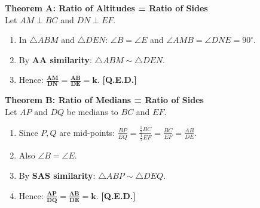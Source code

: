\documentclass[10pt,a4paper]{article}
\begin{document}
\begin{minipage}[t]{0.54\textwidth}
  \textbf{Theorem A: Ratio of Altitudes = Ratio of Sides}\\
  Let $AM \perp BC$ and $DN \perp EF$.
  \begin{enumerate}[leftmargin=4.5mm, itemsep=1.2pt]
    \item In $\triangle ABM$ and $\triangle DEN$:
      $\angle B = \angle E$ and $\angle AMB = \angle DNE = 90^\circ$.
    \item By \textbf{AA similarity}: $\triangle ABM \sim \triangle DEN$.
    \item Hence: $\mathbf{\frac{AM}{DN} = \frac{AB}{DE} = k}$. \textbf{[Q.E.D.]}
  \end{enumerate}

  \vspace{0.8mm}
  \textbf{Theorem B: Ratio of Medians = Ratio of Sides}\\
  Let $AP$ and $DQ$ be medians to $BC$ and $EF$.
  \begin{enumerate}[leftmargin=4.5mm, itemsep=1.2pt]
    \item Since $P, Q$ are mid-points:
      $\frac{BP}{EQ} = \frac{\frac{1}{2}BC}{\frac{1}{2}EF} = \frac{BC}{EF} = \frac{AB}{DE}$.
    \item Also $\angle B = \angle E$.
    \item By \textbf{SAS similarity}: $\triangle ABP \sim \triangle DEQ$.
    \item Hence: $\mathbf{\frac{AP}{DQ} = \frac{AB}{DE} = k}$. \textbf{[Q.E.D.]}
  \end{enumerate}
\end{minipage}\hfill
\end{document}

